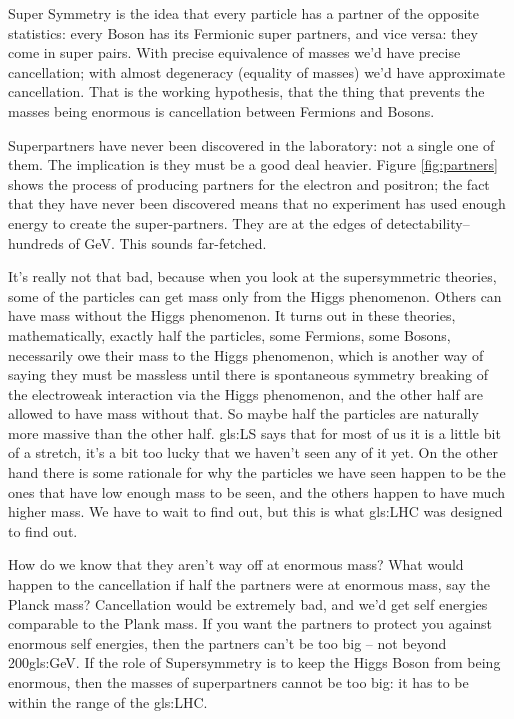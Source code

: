 \documentclass[]{article}
\begin{document}
Super Symmetry is the idea that every particle has a partner of the opposite statistics: every Boson has its Fermionic super partners, and vice versa: they come in super pairs. With precise equivalence of masses we'd have precise cancellation; with almost degeneracy (equality of masses) we'd have approximate cancellation. That is the working hypothesis, that the thing that prevents the masses being enormous is cancellation between Fermions and Bosons.

Superpartners have never been discovered in the laboratory: not a single one of them. The implication is they must be a good deal heavier. Figure \ref{fig:partners} shows the process of producing partners for the electron and positron; the fact that they have never been discovered means that no experiment has used enough energy to  create the super-partners. They are at the edges of detectability--hundreds of GeV. This sounds far-fetched. 

It's really not that bad, because when you look at the supersymmetric theories, some of the particles can get mass only from the Higgs phenomenon. Others can have mass without the Higgs phenomenon. It turns out in these theories, mathematically, exactly half the particles, some Fermions, some Bosons, necessarily owe their mass to the Higgs phenomenon, which is another way of saying they must be massless until there is spontaneous symmetry breaking of the electroweak interaction via the Higgs phenomenon, and the other half are allowed to have mass without that. So maybe half the particles are naturally more massive than the other half. \gls{gls:LS} says that for most of us it is a little bit of a stretch, it's a bit too lucky that we haven't seen any of it yet. On the other hand there is some rationale for why the particles we have seen happen to be the ones that have low enough mass to be seen, and the others happen to have much higher mass. We have to wait to find out, but this is what \gls{gls:LHC} was designed to find out.

How do we know that they aren't way off at enormous mass? What would happen to the cancellation if half the partners were at enormous mass, say the Planck mass? Cancellation would be extremely bad, and we'd get self energies comparable to the Plank mass. If you want the partners to protect you against enormous self energies, then the partners can't be too big -- not beyond 200\gls{gls:GeV}. If the role of Supersymmetry is to keep the Higgs Boson from being enormous, then the masses of superpartners cannot be too big: it has to be within the range of the \gls{gls:LHC}.
\end{document}
